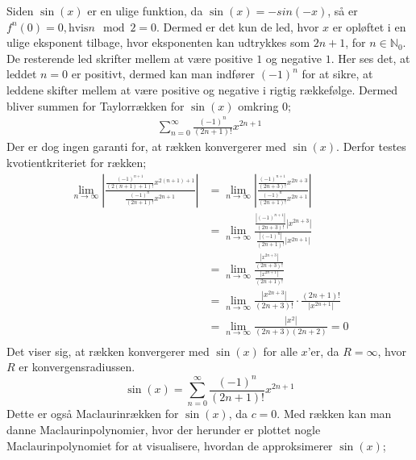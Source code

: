 Siden $\sin(x)$ er en ulige funktion, da $\sin(x)=-sin(-x)$, så er $f^{n}(0)=0, \text{hvis} n \mod 2=0$. Dermed er det kun de led, hvor $x$ er opløftet i en ulige eksponent tilbage, hvor eksponenten kan udtrykkes som $2n+1$, for $n\in \mathbb{N}_0$. De resterende led skrifter mellem at være positive $1$ og negative $1$. Her ses det, at leddet $n=0$ er positivt, dermed kan man indfører $(-1)^n$ for at sikre, at leddene skifter mellem at være positive og negative i rigtig rækkefølge. Dermed bliver summen for Taylorrækken for $\sin(x)$ omkring $0$;
\begin{align*}
\sum_{n=0}^{\infty} \frac{(-1)^n}{(2n+1)!}x^{2n+1}
\end{align*}
Der er dog ingen garanti for, at rækken konvergerer med $\sin(x)$. Derfor testes kvotientkriteriet for rækken;
\begin{align*}
\lim\limits_{n \to \infty}
\left\lvert
\frac{\frac{(-1)^{n+1}}{(2(n+1)+1)!}x^{2(n+1)+1}}
{\frac{(-1)^n}{(2n+1)!}x^{2n+1}} 
\right\lvert
&=
\lim\limits_{n \to \infty}
\left\lvert
\frac{\frac{(-1)^{n+1}}{(2n+3)!}x^{2n+3}}
{\frac{(-1)^n}{(2n+1)!}x^{2n+1}}
\right\lvert 
\\
&=
\lim\limits_{n \to \infty}
\frac{\frac{\left\lvert (-1)^{n+1} \right\lvert }{(2n+3)!} \left\lvert x^{2n+3} \right\lvert }
{\frac{\left\lvert (-1)^n \right\lvert }{(2n+1)!} \left\lvert x^{2n+1} \right\lvert }
\\
&=
\lim\limits_{n \to \infty}
\frac{\frac{\left\lvert x^{2n+3} \right\lvert}{(2n+3)!}}
{\frac{\left\lvert x^{2n+1} \right\lvert}{(2n+1)!} }
\\
&=
\lim\limits_{n \to \infty}
\frac{\left\lvert x^{2n+3} \right\lvert}{(2n+3)!}
\cdot
\frac{(2n+1)!}{\left\lvert x^{2n+1} \right\lvert}
\\
&=
\lim\limits_{n \to \infty}
\frac{\left\lvert x^{2} \right\lvert}{(2n+3)(2n+2)}
=0 \\
\end{align*}
Det viser sig, at rækken konvergerer med $\sin(x)$ for alle $x$'er, da $R=\infty$, hvor $R$ er konvergensradiussen.
\begin{equation}\label{sinrække}
\sin(x)=\sum_{n=0}^{\infty} \frac{(-1)^n}{(2n+1)!}x^{2n+1}
\end{equation}
Dette er også Maclaurinrækken for $\sin(x)$, da $c=0$. Med rækken kan man danne Maclaurinpolynomier, hvor der herunder er plottet nogle Maclaurinpolynomiet for at visualisere, hvordan de approksimerer $\sin(x)$;
